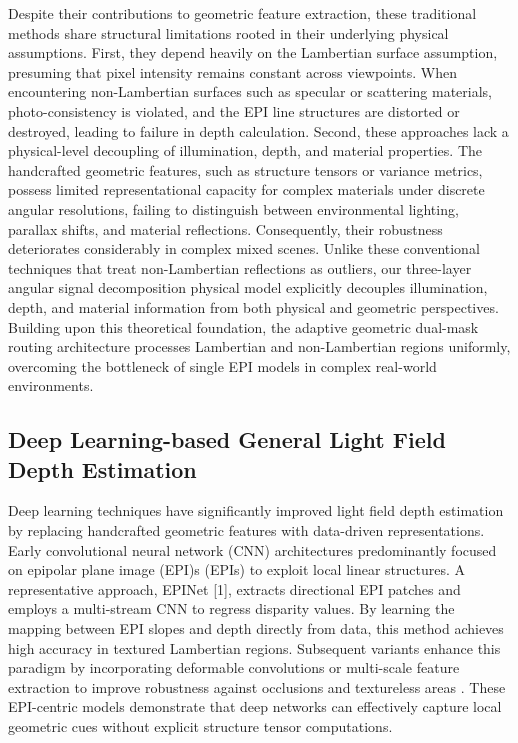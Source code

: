 Despite their contributions to geometric feature extraction, these traditional methods share structural limitations rooted in their underlying physical assumptions. First, they depend heavily on the Lambertian surface assumption, presuming that pixel intensity remains constant across viewpoints. When encountering non-Lambertian surfaces such as specular or scattering materials, photo-consistency is violated, and the EPI line structures are distorted or destroyed, leading to failure in depth calculation. Second, these approaches lack a physical-level decoupling of illumination, depth, and material properties. The handcrafted geometric features, such as structure tensors or variance metrics, possess limited representational capacity for complex materials under discrete angular resolutions, failing to distinguish between environmental lighting, parallax shifts, and material reflections. Consequently, their robustness deteriorates considerably in complex mixed scenes. Unlike these conventional techniques that treat non-Lambertian reflections as outliers, our three-layer angular signal decomposition physical model explicitly decouples illumination, depth, and material information from both physical and geometric perspectives. Building upon this theoretical foundation, the adaptive geometric dual-mask routing architecture processes Lambertian and non-Lambertian regions uniformly, overcoming the bottleneck of single EPI models in complex real-world environments.

\subsection{Deep Learning-based General Light Field Depth Estimation}

Deep learning techniques have significantly improved light field depth estimation by replacing handcrafted geometric features with data-driven representations. Early convolutional neural network (CNN) architectures predominantly focused on epipolar plane image (EPI)s (EPIs) to exploit local linear structures. A representative approach, EPINet [1], extracts directional EPI patches and employs a multi-stream CNN to regress disparity values. By learning the mapping between EPI slopes and depth directly from data, this method achieves high accuracy in textured Lambertian regions. Subsequent variants enhance this paradigm by incorporating deformable convolutions or multi-scale feature extraction to improve robustness against occlusions and textureless areas . These EPI-centric models demonstrate that deep networks can effectively capture local geometric cues without explicit structure tensor computations.

